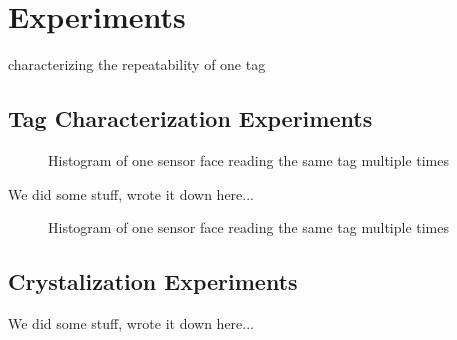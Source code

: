 \section{Experiments}
\label{sec:Experiments}
characterizing the repeatability of one tag


\subsection{Tag Characterization Experiments}

\begin{figure}[H]
	
	\caption{Histogram of one sensor face reading the same tag multiple times}
	\label{fig:histogram}
\end{figure}

We did some stuff, wrote it down here...

\begin{figure}[H]
	
	\caption{Histogram of one sensor face reading the same tag multiple times}
	\label{fig:histogram}
\end{figure}

\subsection{Crystalization Experiments}

We did some stuff, wrote it down here...


